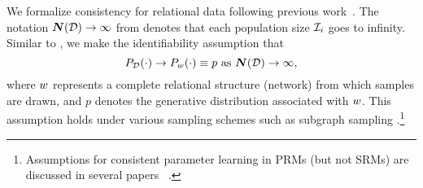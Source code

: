 \documentclass{article}
\begin{document}
We formalize consistency for relational data following previous work~\cite{Sakai2013,Xiang2011}. %
The notation $\boldsymbol{N}(\mathcal{D}) \rightarrow \infty$ from 
denotes that  each population size $\mathcal{I}_{i}$ goes to infinity. %
Similar to \citeauthor{Sakai2013}, we make the identifiability assumption that %
\begin{equation}
   P_{\mathcal{D}}(\cdot)\rightarrow P_{w}(\cdot) \equiv p  \mbox{ as } \boldsymbol{N}(\mathcal{D}) \rightarrow \infty,
   \label{eq:identifiability}\end{equation}
%
where $w$ represents a complete relational structure (network) from which samples are drawn, and $p$ denotes the generative distribution associated with $w$. This assumption holds under various sampling schemes such as subgraph sampling \cite{Frank1978}.\footnote{Assumptions for consistent parameter learning in PRMs (but not SRMs) are discussed in several papers ~\cite{Xiang2011,Shalizi2013,Sakai2013}.}
%
%
\end{document}
